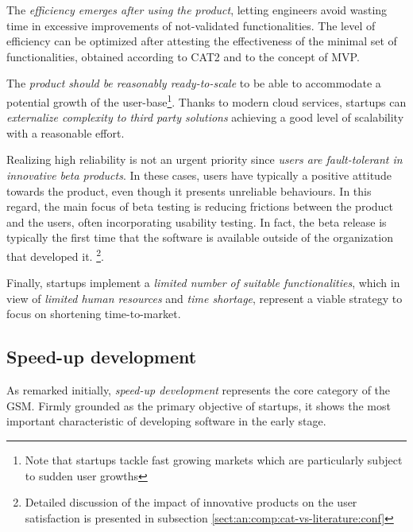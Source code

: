 \documentclass[10pt,journal,letterpaper,compsoc]{IEEEtran}
\begin{document}
\begin{compactitem}

\item The \textit{efficiency emerges after using the product}, letting 
engineers avoid wasting time in excessive improvements of not-validated 
functionalities. The level of efficiency can be optimized after attesting the 
effectiveness of the minimal set of functionalities, obtained according to CAT2 
and to the concept of MVP.
\item The \textit{product should be reasonably ready-to-scale} to be able to 
accommodate a potential growth of the user-base\footnote{Note that startups 
tackle fast growing markets which are particularly subject to sudden user 
growths}. Thanks to modern cloud services, startups can \textit{externalize 
complexity to third party solutions} achieving a good level of scalability with 
a reasonable effort.
\item Realizing high reliability is not an urgent priority since \textit{users 
are fault-tolerant in innovative beta products}. In these cases, users have 
typically a positive attitude towards the product, even though it presents 
unreliable behaviours. In this regard, the main focus of beta testing is 
reducing frictions between the product and the users, often incorporating 
usability testing. In fact, the beta release is typically the first time that 
the software is available outside of the organization that developed it. 
\footnote{Detailed discussion of the impact of innovative products on the user 
satisfaction is presented in subsection \ref{sect:an:comp:cat-vs-literature:conf}}.
\end{compactitem}


Finally, startups implement a \textit{limited number of suitable 
functionalities}, which in view of \textit{limited human resources} and 
\textit{time shortage}, represent a viable strategy to focus on shortening 
time-to-market.
\subsection{Speed-up development}
\label{res:gsm:cat1}
As remarked initially, \textit{speed-up development} represents the core 
category of the GSM. Firmly grounded as the primary objective of startups, it 
shows the most important characteristic of developing software in the early 
stage.
\end{document}
